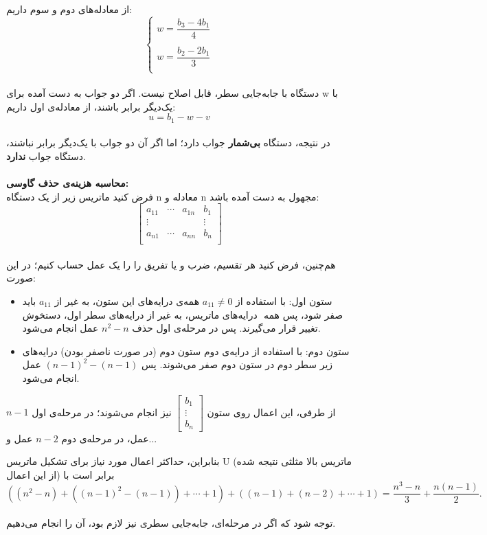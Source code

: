 از معادله‌های دوم و سوم داریم:\\
\[
\left\{
\begin{array}{ccccccc}
w = \dfrac{b_{3} - 4b_{1}}{4}\\\\
w = \dfrac{b_{2} - 2b_{1}}{3}\\
\end{array}
\right.
\]\\
دستگاه با جابه‌جایی سطر، قابل اصلاح نیست. اگر دو جواب به دست آمده برای w با یک‌دیگر برابر باشند، از معادله‌ی اول داریم:
$$u = b_{1} - w - v$$\\
در نتیجه، دستگاه \textbf{بی‌شمار} جواب دارد؛ اما اگر آن دو جواب با یک‌دیگر برابر نباشند، دستگاه جواب \textbf{ندارد}.\\\\
\textbf{محاسبه هزینه‌ی حذف گاوسی:}\\
فرض کنید ماتریس زیر از یک دستگاه n معادله و n مجهول به دست آمده باشد:\\
$$\begin{bmatrix}a_{11}& \cdots &a_{1n}&b_{1}\\ \vdots&&&\vdots \\a_{n1}& \cdots &a_{nn}&b_{n}\\\end{bmatrix}$$ \\
هم‌چنین، فرض کنید هر تقسیم، ضرب و یا تفریق را را یک عمل حساب کنیم؛ در این صورت:\\
\begin{itemize}
	\item ستون اول: با استفاده از $a_{11} \neq 0$ همه‌ی درایه‌های این ستون، به غیر از $a_{11}$ باید صفر شود، پس همه ‌ درایه‌های ماتریس، به غیر از درایه‌های سطر اول، دستخوش تغییر قرار می‌گیرند. پس در مرحله‌ی اول حذف $n^2-n$ عمل انجام می‌شود.
	
	\item ستون دوم: با استفاده از درایه‌ی ‌دوم ستون دوم (در صورت ناصفر بودن) درایه‌های زیر سطر دوم در ستون دوم صفر می‌شوند. پس $(n-1)^2-(n-1)$ عمل انجام می‌شود.
\end{itemize}

از طرفی، این اعمال روی ستون $\begin{bmatrix}b_{1}\\\vdots\\b_{n}\end{bmatrix}$ نیز انجام می‌شوند؛ در مرحله‌ی اول $n-1$ عمل، در مرحله‌ی دوم $n-2$ عمل و...

بنابراین، حداکثر اعمال مورد نیاز برای تشکیل ماتریس U (ماتریس بالا مثلثی نتیجه شده از این اعمال) برابر است با\\
$$((n^2-n) + ((n-1)^2-(n-1)) + \cdots + 1) + ((n-1) + (n-2) + \cdots + 1) = \dfrac{n^3-n}{3} + \dfrac{n(n-1)}{2}.$$\\
توجه شود که اگر در مرحله‌ای، جابه‌جایی سطری نیز لازم بود، آن را انجام می‌دهیم.


